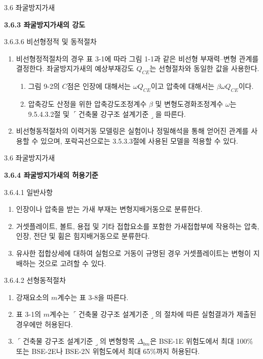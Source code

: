 \begin{frame}{3.6 좌굴방지가새}

	\textbf{3.6.3 좌굴방지가새의 강도}

	3.6.3.6 비선형정적 및 동적절차
	
	\begin{enumerate}
		\item[(1)] 비선형정적절차의 경우 표 3-1에 따라 그림 1-1과 같은 비선형 부재력--변형 관계를 결정한다. 좌굴방지가새의 예상부재강도 $Q_{CE}$는 선형절차와 동일한 값을 사용한다. 
	\begin{enumerate}[label=\large\protect\textcircled{\small\arabic*}]
		\item 그림 9-2의 $C$점은 인장에 대해서는 $\omega Q_{CE}$이고 압축에 대해서는 $\beta \omega Q_{CE}$이다. 
		\item 압축강도 산정을 위한 압축강도조정계수 $\beta$ 및 변형도경화조정계수 $\omega$는 9.5.4.3.2절 및 $\ulcorner$건축물 강구조 설계기준$\lrcorner$을 따른다. 
	\end{enumerate}		
		\item[(2)] 비선형동적절차의 이력거동 모델링은 실험이나 정밀해석을 통해 얻어진 관계를 사용할 수 있으며, 포락곡선으로는 3.5.3.3절에 사용된 모델을 적용할 수 있다. 
	\end{enumerate}
\end{frame}	


	\begin{frame}{3.6 좌굴방지가새}

	\textbf{3.6.4 좌굴방지가새의 허용기준}

	3.6.4.1 일반사항

	\begin{enumerate}
		\item[(1)] 인장이나 압축을 받는 가새 부재는 변형지배거동으로 분류한다. 
		\item[(2)] 거셋플레이트, 볼트, 용접 및 기타 접합요소를 포함한 가새접합부에 작용하는 압축, 인장, 전단 및 휨은 힘지배거동으로 분류한다. 
		\item[(3)] 유사한 접합상세에 대하여 실험으로 거동이 규명된 경우 거셋플레이트는 변형이 지배하는 것으로 고려할 수 있다. 
	\end{enumerate}
	
	3.6.4.2 선형동적절차
	
	\begin{enumerate}
		\item[(1)] 강재요소의 $m$계수는 표 3-8을 따른다. 
		\item[(2)] 표 3-1의 $m$계수는 $\ulcorner$건축물 강구조 설계기준$\lrcorner$의 절차에 따른 실험결과가 제출된 경우에만 허용된다. 
		\item[(3)] $\ulcorner$건축물 강구조 설계기준$\lrcorner$의 변형항목 $\Delta_{bm}$은 BSE-1E 위험도에서 최대 100\% 또는 BSE-2E나 BSE-2N 위험도에서 최대 65\%까지 허용된다. 
	\end{enumerate}

	\end{frame}
	
